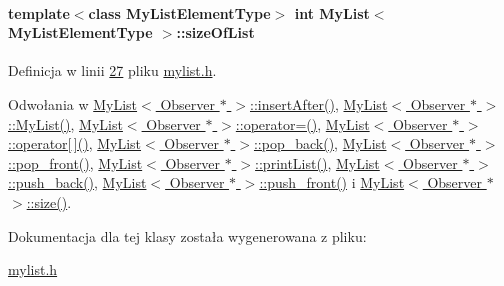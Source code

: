 \hypertarget{class_my_list_a5a3a323664c97313be3a8d0b36866c3f}{
\paragraph[{size\-Of\-List}]{\setlength{\rightskip}{0pt plus 5cm}template$<$class My\-List\-Element\-Type$>$ int {\bf My\-List}$<$ My\-List\-Element\-Type $>$\-::size\-Of\-List}}\label{class_my_list_a5a3a323664c97313be3a8d0b36866c3f}


Definicja w linii \hyperlink{mylist_8h_source_l00027}{27} pliku \hyperlink{mylist_8h_source}{mylist.\-h}.



Odwołania w \hyperlink{mylist_8h_source_l00212}{My\-List$<$ Observer $\ast$ $>$\-::insert\-After()}, \hyperlink{mylist_8h_source_l00039}{My\-List$<$ Observer $\ast$ $>$\-::\-My\-List()}, \hyperlink{mylist_8h_source_l00234}{My\-List$<$ Observer $\ast$ $>$\-::operator=()}, \hyperlink{mylist_8h_source_l00171}{My\-List$<$ Observer $\ast$ $>$\-::operator\mbox{[}$\,$\mbox{]}()}, \hyperlink{mylist_8h_source_l00084}{My\-List$<$ Observer $\ast$ $>$\-::pop\-\_\-back()}, \hyperlink{mylist_8h_source_l00098}{My\-List$<$ Observer $\ast$ $>$\-::pop\-\_\-front()}, \hyperlink{mylist_8h_source_l00156}{My\-List$<$ Observer $\ast$ $>$\-::print\-List()}, \hyperlink{mylist_8h_source_l00112}{My\-List$<$ Observer $\ast$ $>$\-::push\-\_\-back()}, \hyperlink{mylist_8h_source_l00125}{My\-List$<$ Observer $\ast$ $>$\-::push\-\_\-front()} i \hyperlink{mylist_8h_source_l00066}{My\-List$<$ Observer $\ast$ $>$\-::size()}.



Dokumentacja dla tej klasy została wygenerowana z pliku\-:\begin{DoxyCompactItemize}
\item 
\hyperlink{mylist_8h}{mylist.\-h}\end{DoxyCompactItemize}
